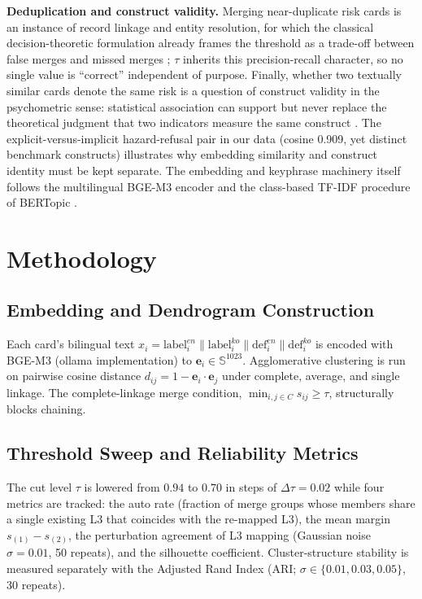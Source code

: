 \documentclass[11pt,a4paper]{article}
\begin{document}
\textbf{Deduplication and construct validity.} Merging near-duplicate risk cards is an instance of record linkage and entity resolution, for which the classical decision-theoretic formulation already frames the threshold as a trade-off between false merges and missed merges \cite{fellegi1969}; $\tau$ inherits this precision-recall character, so no single value is ``correct'' independent of purpose. Finally, whether two textually similar cards denote the same risk is a question of construct validity in the psychometric sense: statistical association can support but never replace the theoretical judgment that two indicators measure the same construct \cite{cronbach1955}. The explicit-versus-implicit hazard-refusal pair in our data (cosine 0.909, yet distinct benchmark constructs) illustrates why embedding similarity and construct identity must be kept separate. The embedding and keyphrase machinery itself follows the multilingual BGE-M3 encoder \cite{chen2024} and the class-based TF-IDF procedure of BERTopic \cite{grootendorst2022}.

\section{Methodology}

\subsection{Embedding and Dendrogram Construction}

Each card's bilingual text $x_i = \mathrm{label}^{en}_i \| \mathrm{label}^{ko}_i \| \mathrm{def}^{en}_i \| \mathrm{def}^{ko}_i$ is encoded with BGE-M3 (ollama implementation) to $\mathbf{e}_i \in \mathbb{S}^{1023}$. Agglomerative clustering is run on pairwise cosine distance $d_{ij}=1-\mathbf{e}_i\cdot\mathbf{e}_j$ under complete, average, and single linkage. The complete-linkage merge condition, $\min_{i,j\in C} s_{ij} \geq \tau$, structurally blocks chaining.

\subsection{Threshold Sweep and Reliability Metrics}

The cut level $\tau$ is lowered from $0.94$ to $0.70$ in steps of $\Delta\tau=0.02$ while four metrics are tracked: the auto rate (fraction of merge groups whose members share a single existing L3 that coincides with the re-mapped L3), the mean margin $s_{(1)}-s_{(2)}$, the perturbation agreement of L3 mapping (Gaussian noise $\sigma=0.01$, 50 repeats), and the silhouette coefficient. Cluster-structure stability is measured separately with the Adjusted Rand Index (ARI; $\sigma\in\{0.01,0.03,0.05\}$, 30 repeats).
\end{document}
